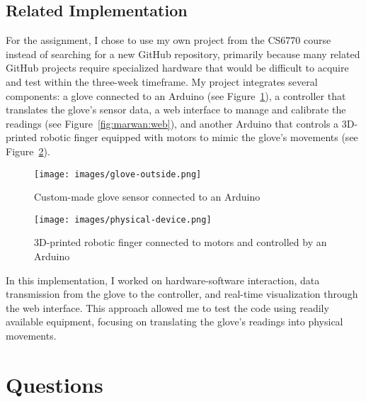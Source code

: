 \subsection{Related Implementation}
For the assignment, I chose to use my own project from the CS6770 course instead of searching for a new GitHub repository, primarily because many related GitHub projects require specialized hardware that would be difficult to acquire and test within the three-week timeframe. My project integrates several components: a glove connected to an Arduino (see Figure~\ref{fig:marwan:glove}), a controller that translates the glove's sensor data, a web interface to manage and calibrate the readings (see Figure~\ref{fig:marwan:web}), and another Arduino that controls a 3D-printed robotic finger equipped with motors to mimic the glove's movements (see Figure~\ref{fig:marwan:3d}).

\begin{figure}[h]
  \centering
  \texttt{[image: images/glove-outside.png]}
  \caption{Custom-made glove sensor connected to an Arduino}
  \label{fig:marwan:glove}
\end{figure}


\begin{figure}[h]
  \centering
  \texttt{[image: images/physical-device.png]}
  \caption{3D-printed robotic finger connected to motors and controlled by an Arduino}
  \label{fig:marwan:3d}
\end{figure}

In this implementation, I worked on hardware-software interaction, data transmission from the glove to the controller, and real-time visualization through the web interface. This approach allowed me to test the code using readily available equipment, focusing on translating the glove's readings into physical movements.

\section{Questions}

